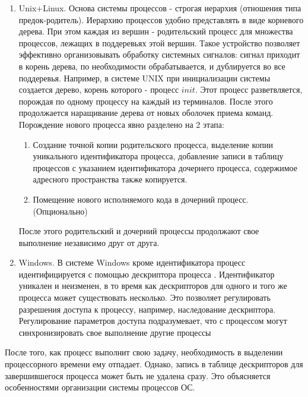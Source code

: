\begin{enumerate}[label=---]
\item Unix+Linux. Основа системы процессов - строгая иерархия (отношения типа предок-родитель). Иерархию процессов удобно представлять в виде корневого дерева. При этом каждая из вершин - родительский процесс для множества процессов, лежащих в поддеревьях этой вершин. Такое устройство позволяет эффективно организовывать обработку системных сигналов: сигнал приходит в корень дерева, по необходимости обрабатывается, и дублируется во все поддеревья. Например, в системе UNIX при инициализации системы создается дерево, корень которого - процесс $init$. Этот процесс разветвляется, порождая по одному процессу на каждый из терминалов. После этого продолжается наращивание дерева от новых оболочек приема команд.\\ 
Порождение нового процесса явно разделено на 2 этапа:
	\begin{enumerate}[label=---]
	\item Создание точной копии родительского процесса, выделение копии уникального идентификатора процесса, добавление записи в таблицу процессов с указанием идентификатора дочернего процесса, содержимое адресного пространства также копируется.
	\item Помещение нового исполняемого кода в дочерний процесс. (Опционально)
	\end{enumerate}
После этого родительский и дочерний процессы продолжают свое выполнение независимо друг от друга.
\item Windows. В системе Windows кроме идентификатора процесс идентифицируется с помощью дескриптора процесса \cite{hart} \cite{rihter}. Идентификатор уникален и неизменен, в то время как дескрипторов для одного и того же процесса может существовать несколько. Это позволяет регулировать разрешения доступа к процессу, например, наследование дескриптора. Регулирование параметров доступа подразумевает, что с процессом могут синхронизировать свое выполнение другие процессы
\end{enumerate}

После того, как процесс выполнит свою задачу, необходимость в выделении процессорного времени ему отпадает. Однако, запись в таблице дескрипторов для завершившегося процесса может быть не удалена сразу. Это объясняется особенностями организации системы процессов ОС.
